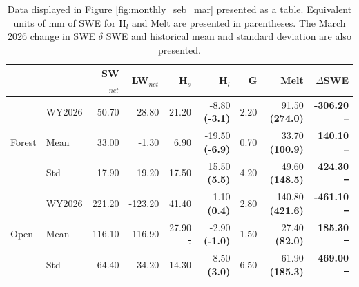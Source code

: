 \documentclass[draft]{agujournal2019}
\newcommand{\hlat}{\textcolor{black}{H$_l$}\xspace}
\providecommand{\DIFdel}[1]{{\protect\color{red}\sout{#1}}}                      %
\providecommand{\DIFdelFL}[1]{\DIFdel{#1}} %
\providecommand{\DIFaddbeginFL}{} %
\providecommand{\DIFaddendFL}{} %
\providecommand{\DIFdelbeginFL}{} %
\providecommand{\DIFdelendFL}{} %
\begin{document}
\begin{table}[h]
\centering
\caption{Data displayed in Figure \ref{fig:monthly_seb_mar} presented as a table. 
Equivalent units of mm of SWE for \hlat and Melt are presented in parentheses. 
The March 2026 change in SWE $\delta$ SWE and historical mean and standard deviation are also presented.
}
\label{tab:forest_open_summary}
\DIFdelbeginFL %
\DIFdelendFL \DIFaddbeginFL \begin{tabular}{llrrrrrrr}
\DIFaddendFL \toprule
 & & SW$_{net}$ & LW$_{net}$ & H$_s$ & H$_l$ & G & Melt & $\Delta$SWE \\
\midrule
\multirow{3}{*}{Forest} & WY2026 & 50.70 & 28.80 & 21.20 & -8.80 \textbf{(-3.1)}  & 2.20   & 91.50 \textbf{(274.0)}          & \textbf{-306.20} \DIFdelbeginFL %
\DIFdelFL{-- }\DIFdelendFL \\
 & Mean & 33.00 & -1.30 & 6.90 & -19.50 \textbf{(-6.9)} & 0.70  & 33.70 \textbf{(100.9)}                                     & \textbf{140.10 } \DIFdelbeginFL %
\DIFdelFL{-- }\DIFdelendFL \\
 & Std & 17.90 & 19.20 & 17.50  & 15.50 \textbf{(5.5)}  & 4.20    & 49.60 \textbf{(148.5)}                                   & \textbf{424.30 } \DIFdelbeginFL %
\DIFdelFL{-- }\DIFdelendFL \\
\midrule
\multirow{3}{*}{Open}   & WY2026 & 221.20 & -123.20 & 41.40 & 1.10  \textbf{(0.4)}   & 2.80   & 140.80 \textbf{(421.6)} & \textbf{-461.10} \DIFdelbeginFL %
\DIFdelFL{-- }\DIFdelendFL \\
 & Mean & 116.10 & -116.90 & 27.90      \DIFdelbeginFL \DIFdelFL{.      }\DIFdelendFL & -2.90 \textbf{(-1.0)} & 1.50  & 27.40 \textbf{(82.0)}                                     & \textbf{185.30} \DIFdelbeginFL %
\DIFdelFL{-- }\DIFdelendFL \\
 & Std & 64.40 & 34.20 & 14.30           & 8.50  \textbf{(3.0)}& 6.50        & 61.90 \textbf{(185.3)}                                    & \textbf{469.00} \DIFdelbeginFL %
\DIFdelFL{-- }\DIFdelendFL \\
\bottomrule
\end{tabular}
\end{table}







\clearpage

\end{document}
